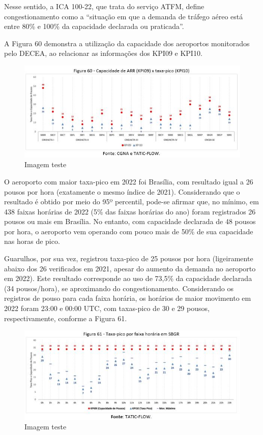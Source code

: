 \documentclass[
]{book}
\begin{document}
Nesse sentido, a ICA 100-22, que trata do serviço ATFM, define congestionamento como a ``situação em que a demanda de tráfego aéreo está entre 80\% e 100\% da capacidade declarada ou praticada''.

A Figura 60 demonstra a utilização da capacidade dos aeroportos monitorados pelo DECEA, ao relacionar as informações dos KPI09 e KPI10.

\begin{figure}
\centering
\includegraphics{imagens/fig49.jpg}
\caption{Imagem teste}
\end{figure}

O aeroporto com maior taxa-pico em 2022 foi Brasília, com resultado igual a 26 pousos por hora (exatamente o mesmo índice de 2021). Considerando que o resultado é obtido por meio do 95º percentil, pode-se afirmar que, no mínimo, em 438 faixas horárias de 2022 (5\% das faixas horárias do ano) foram registrados 26 pousos ou mais em Brasília. No entanto, com capacidade declarada de 48 pousos por hora, o aeroporto vem operando com pouco mais de 50\% de sua capacidade nas horas de pico.

Guarulhos, por sua vez, registrou taxa-pico de 25 pousos por hora (ligeiramente abaixo dos 26 verificados em 2021, apesar do aumento da demanda no aeroporto em 2022). Este resultado corresponde ao uso de 73,5\% da capacidade declarada (34 pousos/hora), se aproximando do congestionamento. Considerando os registros de pouso para cada faixa horária, os horários de maior movimento em 2022 foram 23:00 e 00:00 UTC, com taxas-pico de 30 e 29 pousos, respectivamente, conforme a Figura 61.

\begin{figure}
\centering
\includegraphics{imagens/fig50.jpg}
\caption{Imagem teste}
\end{figure}
\end{document}
